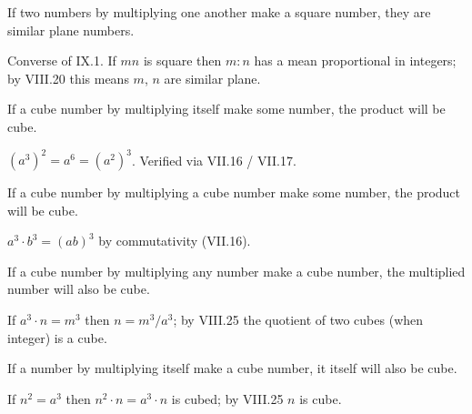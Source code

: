 \documentclass{rrxiv}
\begin{document}
\begin{claim}
\label{prop:IX.2}
If two numbers by multiplying one another make a square number, they
are similar plane numbers.
\end{claim}
\begin{evidence}[Proof of IX.2]
\label{ev:IX.2}
Converse of IX.1.  If $mn$ is square then $m : n$ has a mean
proportional in integers; by VIII.20 this means $m$, $n$ are similar
plane.
\end{evidence}

\begin{claim}
\label{prop:IX.3}
If a cube number by multiplying itself make some number, the product
will be cube.
\end{claim}
\begin{evidence}[Proof of IX.3]
\label{ev:IX.3}
$(a^3)^2 = a^6 = (a^2)^3$.  Verified via VII.16 / VII.17.
\end{evidence}

\begin{claim}
\label{prop:IX.4}
If a cube number by multiplying a cube number make some number, the
product will be cube.
\end{claim}
\begin{evidence}[Proof of IX.4]
\label{ev:IX.4}
$a^3 \cdot b^3 = (ab)^3$ by commutativity (VII.16).
\end{evidence}

\begin{claim}
\label{prop:IX.5}
If a cube number by multiplying any number make a cube number, the
multiplied number will also be cube.
\end{claim}
\begin{evidence}[Proof of IX.5]
\label{ev:IX.5}
If $a^3 \cdot n = m^3$ then $n = m^3 / a^3$; by VIII.25 the quotient
of two cubes (when integer) is a cube.
\end{evidence}

\begin{claim}
\label{prop:IX.6}
If a number by multiplying itself make a cube number, it itself will
also be cube.
\end{claim}
\begin{evidence}[Proof of IX.6]
\label{ev:IX.6}
If $n^2 = a^3$ then $n^2 \cdot n = a^3 \cdot n$ is cubed; by VIII.25
$n$ is cube.
\end{evidence}
\end{document}
